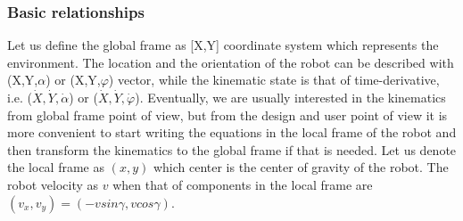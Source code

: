 \documentclass[12pt,english]{article}
\begin{document}
\subsubsection{Basic relationships}
Let us define the global frame as [X,Y] coordinate system which represents the environment. The location and the orientation of the robot can be described with (X,Y,$\alpha$) or (X,Y,$\varphi$) vector, while the kinematic state is that of time-derivative, i.e. ($\dot X, \dot Y, \dot \alpha$) or ($\dot X, \dot Y, \dot \varphi$). Eventually, we are usually interested in the kinematics from global frame point of view, but from the design and user point of view it is more convenient to start writing the equations in the local frame of the robot and then transform the kinematics to the global frame if that is needed. Let us denote the local frame as $(x,y)$ which center is the center of gravity of the robot. The robot velocity as $v$ when that of components in the local frame are $(v_x,v_y) = (- v sin \gamma , v cos \gamma )$.
\end{document}

